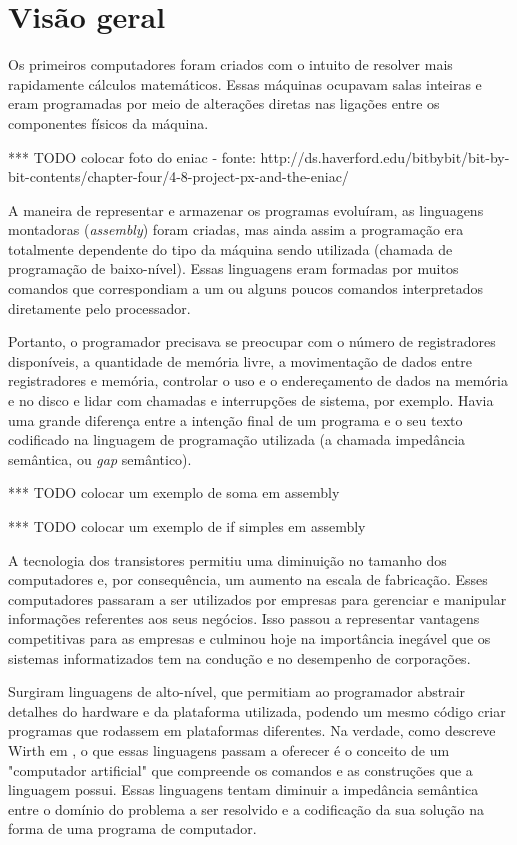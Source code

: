 \documentclass[11pt,twoside,a4paper]{book}
\begin{document}
\section{Visão geral}
\label{sec:visao_geral}
Os primeiros computadores foram criados com o intuito de resolver mais rapidamente cálculos matemáticos. Essas máquinas ocupavam salas inteiras e eram programadas por meio de alterações diretas nas ligações entre os componentes físicos da máquina. 

*** TODO colocar foto do eniac - fonte: http://ds.haverford.edu/bitbybit/bit-by-bit-contents/chapter-four/4-8-project-px-and-the-eniac/

A maneira de representar e armazenar os programas evoluíram, as linguagens montadoras (\emph{assembly}) foram criadas, mas ainda assim a programação era totalmente dependente do tipo da máquina sendo utilizada (chamada de programação de baixo-nível). Essas linguagens eram formadas por muitos comandos que correspondiam a um ou alguns poucos comandos interpretados diretamente pelo processador. 

Portanto, o programador precisava se preocupar com o número de registradores disponíveis, a quantidade de memória livre, a movimentação de dados entre registradores e memória, controlar o uso e o endereçamento de dados na memória e no disco e lidar com chamadas e interrupções de sistema, por exemplo. Havia uma grande diferença entre a intenção final de um programa e o seu texto codificado na linguagem de programação utilizada (a chamada impedância semântica, ou \emph{gap} semântico).

*** TODO colocar um exemplo de soma em assembly

*** TODO colocar um exemplo de if simples em assembly

A tecnologia dos transistores permitiu uma diminuição no tamanho dos computadores e, por consequência, um aumento na escala de fabricação. Esses computadores passaram a ser utilizados por empresas para gerenciar e manipular informações referentes aos seus negócios. Isso passou a representar vantagens competitivas para as empresas e culminou hoje na importância inegável que os sistemas informatizados tem na condução e no desempenho de corporações.

Surgiram linguagens de alto-nível, que permitiam ao programador abstrair detalhes do hardware e da plataforma utilizada, podendo um mesmo código criar programas que rodassem em plataformas diferentes. Na verdade, como descreve Wirth em \cite{alg_ds}, o que essas linguagens passam a oferecer é o conceito de um "computador artificial" que compreende os comandos e as construções que a linguagem possui. Essas linguagens tentam diminuir a impedância semântica entre o domínio do problema a ser resolvido e a codificação da sua solução na forma de uma programa de computador.
\end{document}
